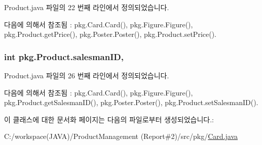 Product.\+java 파일의 22 번째 라인에서 정의되었습니다.



다음에 의해서 참조됨 \+:  pkg.\+Card.\+Card(), pkg.\+Figure.\+Figure(), pkg.\+Product.\+get\+Price(), pkg.\+Poster.\+Poster(), pkg.\+Product.\+set\+Price().

\subsubsection[{\texorpdfstring{salesman\+ID}{salesmanID}}]{\setlength{\rightskip}{0pt plus 5cm}int pkg.\+Product.\+salesman\+ID\hspace{0.3cm}{\ttfamily [protected]}, {\ttfamily [inherited]}}\hypertarget{classpkg_1_1_product_aecf411b201022fca17571e9afbc76747}{}\label{classpkg_1_1_product_aecf411b201022fca17571e9afbc76747}


Product.\+java 파일의 26 번째 라인에서 정의되었습니다.



다음에 의해서 참조됨 \+:  pkg.\+Card.\+Card(), pkg.\+Figure.\+Figure(), pkg.\+Product.\+get\+Salesman\+I\+D(), pkg.\+Poster.\+Poster(), pkg.\+Product.\+set\+Salesman\+I\+D().



이 클래스에 대한 문서화 페이지는 다음의 파일로부터 생성되었습니다.\+:\begin{DoxyCompactItemize}
\item 
C\+:/workspace(\+J\+A\+V\+A)/\+Product\+Management (\+Report\#2)/src/pkg/\hyperlink{_card_8java}{Card.\+java}\end{DoxyCompactItemize}
